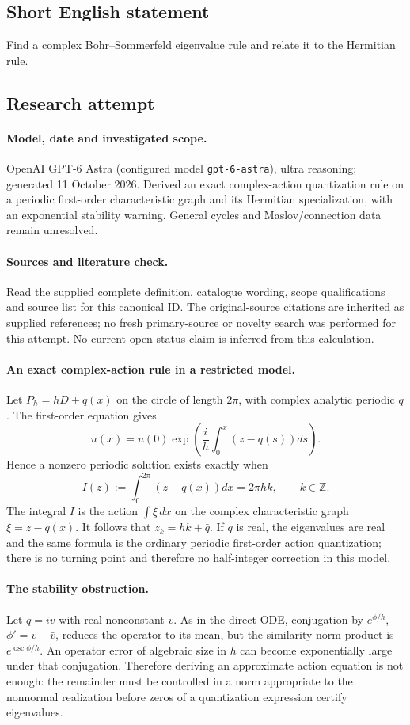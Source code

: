 \documentclass[11pt]{article}
\begin{document}
\subsection{Short English statement}
Find a complex Bohr--Sommerfeld eigenvalue rule and relate it to the Hermitian rule.
\subsection{Research attempt}
\paragraph{Model, date and investigated scope.}
OpenAI GPT-6 Astra (configured model \texttt{gpt-6-astra}), ultra reasoning; generated 11 October 2026. Derived an exact complex-action quantization rule on a periodic first-order characteristic graph and its Hermitian specialization, with an exponential stability warning. General cycles and Maslov/connection data remain unresolved.

\paragraph{Sources and literature check.}
Read the supplied complete definition, catalogue wording, scope qualifications and source list for this canonical ID. The original-source citations are inherited as supplied references; no fresh primary-source or novelty search was performed for this attempt. No current open-status claim is inferred from this calculation.

\paragraph{An exact complex-action rule in a restricted model.}Let \(P_h=hD+q(x)\) on the circle of length \(2\pi\), with complex analytic periodic \(q\). The first-order equation gives
\[u(x)=u(0)\exp\left(\frac{i}{h}\int_0^x(z-q(s))ds\right).
\]
Hence a nonzero periodic solution exists exactly when
\[I(z):=\int_0^{2\pi}(z-q(x))dx=2\pi hk,\qquad k\in\mathbb Z.
\]
The integral \(I\) is the action \(\int\xi\,dx\) on the complex characteristic graph \(\xi=z-q(x)\). It follows that \(z_k=hk+\bar q\). If \(q\) is real, the eigenvalues are real and the same formula is the ordinary periodic first-order action quantization; there is no turning point and therefore no half-integer correction in this model.
\paragraph{The stability obstruction.}Let \(q=iv\) with real nonconstant \(v\). As in the direct ODE, conjugation by \(e^{\phi/h}\), \(\phi'=v-\bar v\), reduces the operator to its mean, but the similarity norm product is \(e^{\operatorname{osc}\phi/h}\). An operator error of algebraic size in \(h\) can become exponentially large under that conjugation. Therefore deriving an approximate action equation is not enough: the remainder must be controlled in a norm appropriate to the nonnormal realization before zeros of a quantization expression certify eigenvalues.
\end{document}
